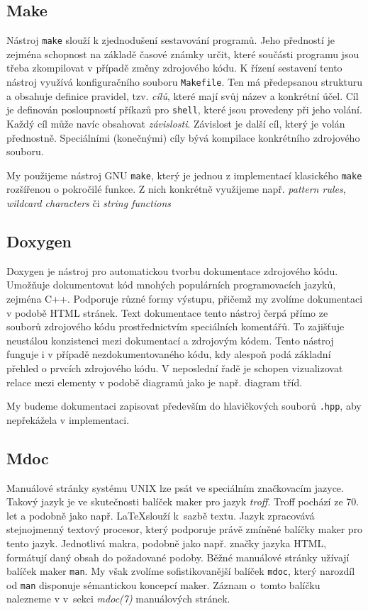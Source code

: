 \documentclass[thesis=B,czech,hidelinks]{thesis}[2012/06/26]
\begin{document}
\subsection{Make}

Nástroj \texttt{make} slouží k zjednodušení sestavování programů. Jeho předností je zejména schopnost na základě časové známky určit, které součásti programu jsou třeba zkompilovat v případě změny zdrojového kódu. K řízení sestavení tento nástroj využívá konfiguračního souboru \texttt{Makefile}. Ten má předepsanou strukturu a obsahuje definice pravidel, tzv. \emph{cílů}, které mají svůj název a konkrétní účel. Cíl je definován posloupností příkazů pro \texttt{shell}, které jsou provedeny při jeho volání. Každý cíl může navíc obsahovat \emph{závislosti}. Závislost je další cíl, který je volán přednostně. Speciálními (konečnými) cíly bývá kompilace konkrétního zdrojového souboru\cite{gmake}.

My použijeme nástroj GNU \texttt{make}, který je jednou z implementací klasického \texttt{make} rozšířenou o pokročilé funkce. Z nich konkrétně využijeme např. \emph{pattern rules}, \emph{wildcard characters} či \emph{string functions}\cite{gmake}

\subsection{Doxygen}

Doxygen je nástroj pro automatickou tvorbu dokumentace zdrojového kódu. Umožňuje dokumentovat kód mnohých populárních programovacích jazyků, zejména C++. Podporuje různé formy výstupu, přičemž my zvolíme dokumentaci v podobě HTML stránek. Text dokumentace tento nástroj čerpá přímo ze souborů zdrojového kódu prostřednictvím speciálních komentářů. To zajišťuje neustálou konzistenci mezi dokumentací a zdrojovým kódem. Tento nástroj funguje i v případě nezdokumentovaného kódu, kdy alespoň podá základní přehled o prvcích zdrojového kódu. V neposlední řadě je schopen vizualizovat relace mezi elementy v podobě diagramů jako je např. diagram tříd\cite{doxygen}.

My budeme dokumentaci zapisovat především do hlavičkových souborů \texttt{.hpp}, aby nepřekážela v implementaci.

\subsection{Mdoc}

Manuálové stránky systému UNIX lze psát ve speciálním značkovacím jazyce. Takový jazyk je ve skutečnosti balíček maker pro jazyk \emph{troff}. Troff pochází ze 70. let a podobně jako např. \LaTeX slouží k~sazbě textu. Jazyk zpracovává stejnojmenný textový procesor, který podporuje právě zmíněné balíčky maker pro tento jazyk. Jednotlivá makra, podobně jako např. značky jazyka HTML, formátují daný obsah do požadované podoby\cite{troff}. Běžné manuálové stránky užívají balíček maker \texttt{man}. My však zvolíme sofistikovanější balíček \texttt{mdoc}, který narozdíl od \texttt{man} disponuje sémantickou koncepcí maker. Záznam o~tomto balíčku nalezneme v v~sekci \emph{mdoc(7)} manuálových stránek\cite{mdoc}.
\end{document}
